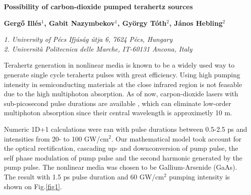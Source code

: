 \documentclass{article}
\begin{document}
\begin{center}
{\Large\bfseries
Possibility of carbon\hyp{}dioxide pumped terahertz sources\par}
\vspace{3ex}
{\bfseries
Gergő Illés$^{1}$, Gabit Nazymbekov$^{1}$, György Tóth$^{2}$, János Hebling$^{2}$\par}
{\footnotesize\itshape
1. University of Pécs Ifjúság útja 6, 7624 Pécs, Hungary\\
2. Universit\`a Politecnica delle Marche, IT-60131 Ancona, Italy\par}
\vspace{3ex}
\end{center}
Terahertz generation in nonlinear media is known to be a widely used way to generate single cycle terahertz pulses with great efficiency. Using high pumping intensity in semiconducting materials at the close infrared region is not feasable due to the high multiphoton absorption. \cite{polonyi2016high} As of now, carpon\hyp{}dioxide lasers with sub-picosecond pulse durations are available \cite{polyanskiy2020demonstration}, which can eliminate low-order multiphoton absorption since their central wavelength is approximetly 10 \textmu m.

Numeric 1D+1 calculations were ran with pulse durations between 0.5\hyp{}2.5 ps and intensities from 20\hyp{} to 100 GW/cm$^2$. Our mathematical model took account for the optical rectification, cascading up\hyp{} and downconversion of pump pulse, the self phase modulation of pump pulse \cite{ravi2014limitations} and the second harmonic generated by the pump pulse. The nonlinear media was chosen to be Gallium-Arsenide (GaAs). The result with 1.5 ps pulse duration and 60 GW/cm$^2$ pumping intensity is shown on {Fig.\ref{fig1}}.

\end{document}
